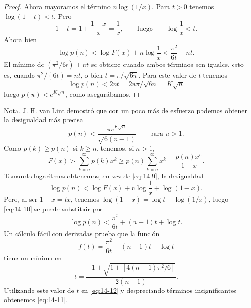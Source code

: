 \documentclass[12pt,a4paper]{book}
\begin{document}
\begin{proof}
        Ahora mayoramos el término $n\log(1/x)$. Para $t>0$ tenemos $\log(1+t)<t$. Pero
        \begin{equation*}
            1+t=1+\frac{1-x}{x}=\frac{1}{x},\qquad\text{luego}\qquad\log\frac{1}{x}<t.
        \end{equation*}
        Ahora bien
        \begin{equation}\label{eq:14-10}
            \log p(n)<\log F(x)+n\log\frac{1}{x}<\frac{\pi^{2}}{6t}+nt.
        \end{equation}
        El mínimo de $(\pi^{2}/6t)+nt$ se obtiene cuando ambos términos son iguales, esto es,
        cuando $\pi^{2}/(6t)=nt$, o bien $t=\pi/\sqrt{6n}$. Para este valor de $t$ tenemos
        \begin{equation*}
            \log p(n)<2nt=2n\pi/\sqrt{6n}=K\sqrt{n}
        \end{equation*}
        luego $p(n)<e^{K\sqrt{n}}$, como asegurábamos.
    \end{proof}

    Nota. J. H. van Lint \cite{vanlint1974} demostró que con un poco más de esfuerzo podemos
    obtener la desigualdad más precisa
    \begin{equation}\label{eq:14-11}
        p(n)<\frac{\pi e^{K\sqrt{n}}}{\sqrt{6(n-1)}}\qquad\text{para }n>1.
    \end{equation}
    Como $p(k)\geq p(n)$ si $k\geq n$, tenemos, si $n>1$,
    \begin{equation*}
        F(x)>\sum_{k=n}^{\infty}p(k)x^{k}\geq p(n)\sum_{k=n}^{\infty}x^{k}=\frac{p(n)x^{n}}{1-x}.
    \end{equation*}
    Tomando logaritmos obtenemos, en vez de \eqref{eq:14-9}, la desigualdad
    \begin{equation*}
        \log p(n)<\log F(x)+n\log\frac{1}{x}+\log(1-x).
    \end{equation*}
    Pero, al ser $1-x=tx$, tenemos $\log(1-x)=\log t-\log(1/x)$, luego \eqref{eq:14-10} se puede
    substituir por
    \begin{equation}\label{eq:14-12}
        \log p(n)<\frac{\pi^{2}}{6t}+(n-1)t+\log t.
    \end{equation}
    Un cálculo fácil con derivadas prueba que la función
    \begin{equation*}
        f(t)=\frac{\pi^{2}}{6t}+(n-1)t+\log t
    \end{equation*}
    tiene un mínimo en
    \begin{equation*}
        t=\frac{-1+\sqrt{1+[4(n-1)\pi^{2}/6]}}{2(n-1)}.
    \end{equation*}
    Utilizando este valor de $t$ en \eqref{eq:14-12} y despreciando términos insignificantes
    obtenemos \eqref{eq:14-11}.
\end{document}

